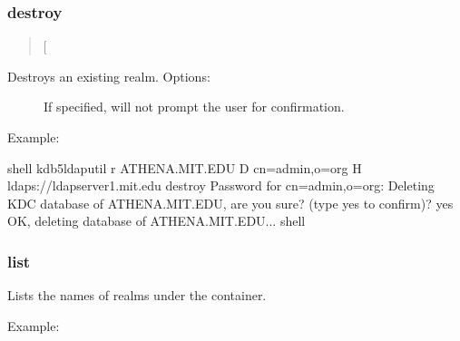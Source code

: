 \documentclass[letterpaper,10pt,english]{sphinxmanual}
\begin{document}
\subsubsection{destroy}
\label{\detokenize{admin/admin_commands/kdb5_ldap_util:destroy}}\label{\detokenize{admin/admin_commands/kdb5_ldap_util:kdb5-ldap-util-view-end}}\label{\detokenize{admin/admin_commands/kdb5_ldap_util:kdb5-ldap-util-destroy}}\begin{quote}

 {[}\sphinxstylestrong{-f}{]}
\end{quote}

Destroys an existing realm. Options:
\begin{description}
\item[{}] \leavevmode
If specified, will not prompt the user for confirmation.

\end{description}

Example:

%
\begin{sphinxVerbatim}[commandchars=\\\{\}]
shell\PYGZpc{} kdb5\PYGZus{}ldap\PYGZus{}util \PYGZhy{}r ATHENA.MIT.EDU \PYGZhy{}D cn=admin,o=org \PYGZhy{}H
    ldaps://ldap\PYGZhy{}server1.mit.edu destroy
Password for \PYGZdq{}cn=admin,o=org\PYGZdq{}:
Deleting KDC database of \PYGZsq{}ATHENA.MIT.EDU\PYGZsq{}, are you sure?
(type \PYGZsq{}yes\PYGZsq{} to confirm)? yes
OK, deleting database of \PYGZsq{}ATHENA.MIT.EDU\PYGZsq{}...
shell\PYGZpc{}
\end{sphinxVerbatim}


\subsubsection{list}
\label{\detokenize{admin/admin_commands/kdb5_ldap_util:kdb5-ldap-util-destroy-end}}\label{\detokenize{admin/admin_commands/kdb5_ldap_util:list}}\label{\detokenize{admin/admin_commands/kdb5_ldap_util:kdb5-ldap-util-list}}\begin{quote}

\end{quote}

Lists the names of realms under the container.

Example:
\end{document}

